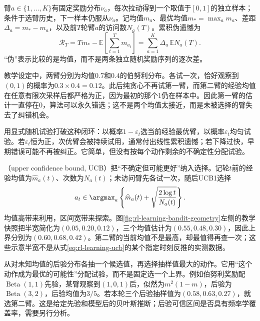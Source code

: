 \begin{definition}[有界随机老虎机]
  \label{def:rl-learning-stochastic-bandit}
  臂$a\in\{1,\ldots,K\}$有固定奖励分布$\nu_a$，每次拉动得到一个取值于$[0,1]$的独立样本；条件于选臂历史，下一样本仍服从$\nu_a$。记均值$m_a$、最优均值$m_*=\max_a m_a$、差距$\Delta_a=m_*-m_a$，以及前$T$轮臂$a$的访问数$N_a(T)$。累积伪遗憾为
  \begin{equation}
    \mathcal R_T
    =T m_*-\mathbb E\!\left[\sum_{t=1}^T m_{a_t}\right]
    =\sum_{a=1}^K\Delta_a\,\mathbb E N_a(T).
    \label{eq:rl-learning-bandit-regret}
  \end{equation}
  “伪”表示比较的是均值，而不是两条独立随机奖励序列的逐次差。
\end{definition}

\begin{example}[一次噪声如何锁住贪心策略]
  \label{ex:rl-learning-greedy-trap}
  教学设定中，两臂分别为均值$0.7$和$0.4$的伯努利分布。各试一次，恰好观察到$(0,1)$的概率为$0.3\times0.4=0.12$。此后纯贪心不再试第一臂，而第二臂的经验均值在任意有限次采样后都严格为正，因为最初的那个1仍在样本中。因此第一臂的估计一直停在0，算法可以永久错选；这不是两个均值太接近，而是未被选择的臂失去了纠错机会。
\end{example}

用显式随机试验打破这种闭环：以概率$1-\varepsilon_t$选当前经验最优臂，以概率$\varepsilon_t$均匀试验。若$\varepsilon_t$恒为正，次优臂会被持续试用，通常付出线性累积遗憾；若下降过快，早期错误可能不再被纠正。它简单，但没有按每个动作剩余的不确定性分配试验。

（upper confidence bound, UCB）把“不确定但可能更好”纳入选择。记轮$t$前的经验均值为$\widehat m_a(t)$、次数为$N_a(t)$；未访问臂先各试一次，随后UCB1选择
\begin{equation}
  a_t\in\argmax_a\left\{\widehat m_a(t)
    +\sqrt{\frac{2\log t}{N_a(t)}}\right\}.
  \label{eq:rl-learning-ucb}
\end{equation}
均值高带来利用，区间宽带来探索。图\ref{fig:rl-learning-bandit-geometry}左侧的教学快照把半宽简化为$(0.05,0.20,0.12)$，三个均值估计为$(0.55,0.48,0.30)$，因此上界分别为$(0.60,0.68,0.42)$。第二臂的当前均值不是最高，却最值得再查一次；这些示意半宽不是从式\eqref{eq:rl-learning-ucb}的某个指定时刻反推的实测数据。

从对未知均值的后验分布各抽一个候选值，再选择抽样值最大的动作。它用“这个动作成为最优的可能性”分配试验，而不是固定选一个上界。例如伯努利奖励配$\operatorname{Beta}(1,1)$先验，某臂观察到$(1,0,1)$后，似然为$m^2(1-m)$，后验为$\operatorname{Beta}(3,2)$，后验均值为$3/5$。若本轮三个后验抽样值为$(0.58,0.63,0.27)$，就选第二臂。这是给定先验和模型后的贝叶斯推断；后验可信区间是否具有频率学覆盖率，需要另行分析。

